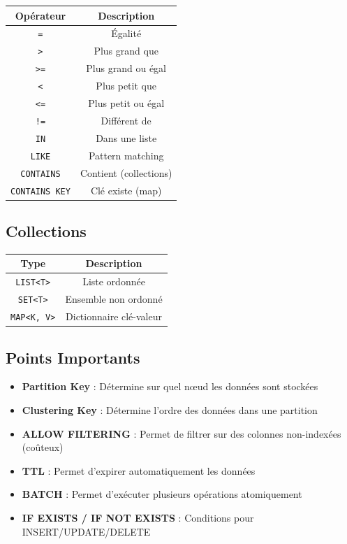 \documentclass[11pt,a4paper]{article}
\begin{document}
\begin{table}[h]
\centering
\begin{tabular}{|c|c|}
\hline
\textbf{Opérateur} & \textbf{Description} \\
\hline
\texttt{=} & Égalité \\
\hline
\texttt{>} & Plus grand que \\
\hline
\texttt{>=} & Plus grand ou égal \\
\hline
\texttt{<} & Plus petit que \\
\hline
\texttt{<=} & Plus petit ou égal \\
\hline
\texttt{!=} & Différent de \\
\hline
\texttt{IN} & Dans une liste \\
\hline
\texttt{LIKE} & Pattern matching \\
\hline
\texttt{CONTAINS} & Contient (collections) \\
\hline
\texttt{CONTAINS KEY} & Clé existe (map) \\
\hline
\end{tabular}
\end{table}

\subsection{Collections}

\begin{table}[h]
\centering
\begin{tabular}{|c|c|}
\hline
\textbf{Type} & \textbf{Description} \\
\hline
\texttt{LIST<T>} & Liste ordonnée \\
\hline
\texttt{SET<T>} & Ensemble non ordonné \\
\hline
\texttt{MAP<K, V>} & Dictionnaire clé-valeur \\
\hline
\end{tabular}
\end{table}

\subsection{Points Importants}

\begin{itemize}
    \item \textbf{Partition Key} : Détermine sur quel nœud les données sont stockées
    \item \textbf{Clustering Key} : Détermine l'ordre des données dans une partition
    \item \textbf{ALLOW FILTERING} : Permet de filtrer sur des colonnes non-indexées (coûteux)
    \item \textbf{TTL} : Permet d'expirer automatiquement les données
    \item \textbf{BATCH} : Permet d'exécuter plusieurs opérations atomiquement
    \item \textbf{IF EXISTS / IF NOT EXISTS} : Conditions pour INSERT/UPDATE/DELETE
\end{itemize}
\end{document}
